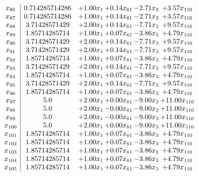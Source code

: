 \documentclass[8pt]{article}
\begin{document}
\[\begin{array}{c| c c@{\hskip 2pt} c@{\hskip 2pt} c@{\hskip 2pt} c@{\hskip 2pt} }
 x_{86}   &  0.714285714286 & +  1.00 x_{1} & +  0.14 x_{61} & -2.71 x_{3} & +  3.57 x_{110}\\
 x_{87}   &  0.714285714286 & +  1.00 x_{1} & +  0.14 x_{61} & -2.71 x_{3} & +  3.57 x_{110}\\
 x_{88}   &  3.71428571429 & +  2.00 x_{1} & +  0.14 x_{61} & -7.71 x_{3} & +  9.57 x_{110}\\
 x_{89}   &  1.85714285714 & +  1.00 x_{1} & +  0.07 x_{61} & -3.86 x_{3} & +  4.79 x_{110}\\
 x_{90}   &  3.71428571429 & +  2.00 x_{1} & +  0.14 x_{61} & -7.71 x_{3} & +  9.57 x_{110}\\
 x_{91}   &  3.71428571429 & +  2.00 x_{1} & +  0.14 x_{61} & -7.71 x_{3} & +  9.57 x_{110}\\
 x_{92}   &  1.85714285714 & +  1.00 x_{1} & +  0.07 x_{61} & -3.86 x_{3} & +  4.79 x_{110}\\
 x_{93}   &  3.71428571429 & +  2.00 x_{1} & +  0.14 x_{61} & -7.71 x_{3} & +  9.57 x_{110}\\
 x_{94}   &  1.85714285714 & +  1.00 x_{1} & +  0.07 x_{61} & -3.86 x_{3} & +  4.79 x_{110}\\
 x_{95}   &  3.71428571429 & +  2.00 x_{1} & +  0.14 x_{61} & -7.71 x_{3} & +  9.57 x_{110}\\
 x_{96}   &  1.85714285714 & +  1.00 x_{1} & +  0.07 x_{61} & -3.86 x_{3} & +  4.79 x_{110}\\
 x_{97}   &  5.0 & +  2.00 x_{1} & +  0.00 x_{61} & -9.00 x_{3} & + 11.00 x_{110}\\
 x_{98}   &  5.0 & +  2.00 x_{1} & -0.00 x_{61} & -9.00 x_{3} & + 11.00 x_{110}\\
 x_{99}   &  5.0 & +  2.00 x_{1} & -0.00 x_{61} & -9.00 x_{3} & + 11.00 x_{110}\\
 x_{100}   &  5.0 & +  2.00 x_{1} & +  0.00 x_{61} & -9.00 x_{3} & + 11.00 x_{110}\\
 x_{101}   &  1.85714285714 & +  1.00 x_{1} & +  0.07 x_{61} & -3.86 x_{3} & +  4.79 x_{110}\\
 x_{102}   &  1.85714285714 & +  1.00 x_{1} & +  0.07 x_{61} & -3.86 x_{3} & +  4.79 x_{110}\\
 x_{103}   &  1.85714285714 & +  1.00 x_{1} & +  0.07 x_{61} & -3.86 x_{3} & +  4.79 x_{110}\\
 x_{104}   &  1.85714285714 & +  1.00 x_{1} & +  0.07 x_{61} & -3.86 x_{3} & +  4.79 x_{110}\\
 x_{105}   &  1.85714285714 & +  1.00 x_{1} & +  0.07 x_{61} & -3.86 x_{3} & +  4.79 x_{110}\\

\end{array}\]
\end{document}
